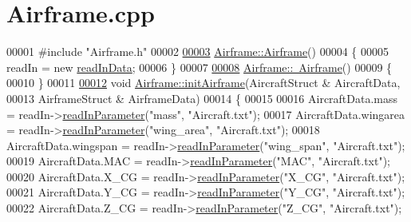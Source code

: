 \hypertarget{_airframe_8cpp_source}{}\section{Airframe.\+cpp}
\label{_airframe_8cpp_source}

\begin{DoxyCode}
00001 \textcolor{preprocessor}{#include "Airframe.h"}
00002 
\hyperlink{group___airframe_a5e6632c7d0c5bc5b889de6cc2407944f}{00003} \hyperlink{group___airframe_a5e6632c7d0c5bc5b889de6cc2407944f}{Airframe::Airframe}()
00004 \{
00005     readIn = \textcolor{keyword}{new} \hyperlink{classread_in_data}{readInData};
00006 \}
00007 
\hyperlink{group___airframe_af849116afbf7c4d7d2d5c189ff68cb7d}{00008} \hyperlink{group___airframe_af849116afbf7c4d7d2d5c189ff68cb7d}{Airframe::~Airframe}()
00009 \{
00010 \}
00011 
\hyperlink{group___airframe_a57b5f7a74d11723186f34fc183e1581b}{00012} \textcolor{keywordtype}{void} \hyperlink{group___airframe_a57b5f7a74d11723186f34fc183e1581b}{Airframe::initAirframe}(AircraftStruct & AircraftData,
00013                             AirframeStruct & AirframeData)
00014 \{
00015 
00016     AircraftData.mass       = readIn->\hyperlink{classread_in_data_a9ae979e74958b43424cb6cf4a22043d7}{readInParameter}(\textcolor{stringliteral}{"mass"}, \textcolor{stringliteral}{"Aircraft.txt"});
00017     AircraftData.wingarea   = readIn->\hyperlink{classread_in_data_a9ae979e74958b43424cb6cf4a22043d7}{readInParameter}(\textcolor{stringliteral}{"wing\_area"}, \textcolor{stringliteral}{"Aircraft.txt"});
00018     AircraftData.wingspan   = readIn->\hyperlink{classread_in_data_a9ae979e74958b43424cb6cf4a22043d7}{readInParameter}(\textcolor{stringliteral}{"wing\_span"}, \textcolor{stringliteral}{"Aircraft.txt"});
00019     AircraftData.MAC        = readIn->\hyperlink{classread_in_data_a9ae979e74958b43424cb6cf4a22043d7}{readInParameter}(\textcolor{stringliteral}{"MAC"}, \textcolor{stringliteral}{"Aircraft.txt"});
00020     AircraftData.X\_CG       = readIn->\hyperlink{classread_in_data_a9ae979e74958b43424cb6cf4a22043d7}{readInParameter}(\textcolor{stringliteral}{"X\_CG"}, \textcolor{stringliteral}{"Aircraft.txt"});
00021     AircraftData.Y\_CG       = readIn->\hyperlink{classread_in_data_a9ae979e74958b43424cb6cf4a22043d7}{readInParameter}(\textcolor{stringliteral}{"Y\_CG"}, \textcolor{stringliteral}{"Aircraft.txt"});
00022     AircraftData.Z\_CG       = readIn->\hyperlink{classread_in_data_a9ae979e74958b43424cb6cf4a22043d7}{readInParameter}(\textcolor{stringliteral}{"Z\_CG"}, \textcolor{stringliteral}{"Aircraft.txt"});

\end{DoxyCode}
